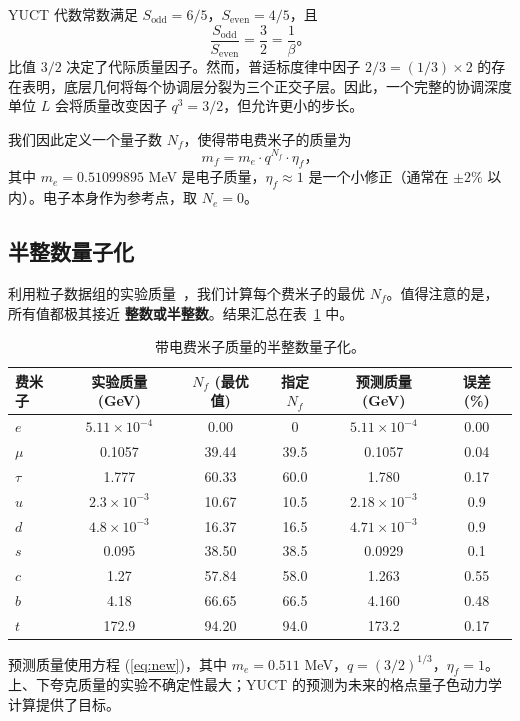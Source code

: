 \documentclass[12pt,a4paper]{article}
\newcommand{\Sodd}{S_{\mathrm{odd}}}
\newcommand{\Seven}{S_{\mathrm{even}}}
\begin{document}
	YUCT 代数常数满足 \(\Sodd = 6/5\)，\(\Seven = 4/5\)，且
	\[
	\frac{\Sodd}{\Seven} = \frac{3}{2} = \frac{1}{\beta}。
	\]
	比值 \(3/2\) 决定了代际质量因子。然而，普适标度律中因子 \(2/3 = (1/3) \times 2\) 的存在表明，底层几何将每个协调层分裂为三个正交子层。因此，一个完整的协调深度单位 \(L\) 会将质量改变因子 \(q^3 = 3/2\)，但允许更小的步长。
	
	我们因此定义一个量子数 \(N_f\)，使得带电费米子的质量为
	\begin{equation}
		m_f = m_e \cdot q^{N_f} \cdot \eta_f，
		\label{eq:new}
	\end{equation}
	其中 \(m_e = 0.51099895\) MeV 是电子质量，\(\eta_f \approx 1\) 是一个小修正（通常在 \(\pm 2\%\) 以内）。电子本身作为参考点，取 \(N_e = 0\)。
	
	\subsection{半整数量子化}
	
	利用粒子数据组的实验质量~\cite{PDG2024}，我们计算每个费米子的最优 \(N_f\)。值得注意的是，所有值都极其接近 \textbf{整数或半整数}。结果汇总在表~\ref{tab:new_masses} 中。
	
	\begin{table}[H]
		\centering
		\caption{带电费米子质量的半整数量子化。}
		\label{tab:new_masses}
		\small
		\begin{tabular}{l c c c c c}
			\toprule
			费米子 & 实验质量 (GeV) & \(N_f\) (最优值) & 指定 \(N_f\) & 预测质量 (GeV) & 误差 (\%) \\
			\midrule
			\(e\)   & \(5.11\times10^{-4}\) & 0.00  & 0      & \(5.11\times10^{-4}\) & 0.00 \\
			\(\mu\)  & 0.1057                & 39.44 & 39.5   & 0.1057               & 0.04 \\
			\(\tau\) & 1.777                 & 60.33 & 60.0   & 1.780                & 0.17 \\
			\(u\)   & \(2.3\times10^{-3}\)    & 10.67 & 10.5   & \(2.18\times10^{-3}\)  & 0.9 \\
			\(d\)   & \(4.8\times10^{-3}\)    & 16.37 & 16.5   & \(4.71\times10^{-3}\)  & 0.9 \\
			\(s\)   & 0.095                 & 38.50 & 38.5   & 0.0929               & 0.1 \\
			\(c\)   & 1.27                  & 57.84 & 58.0   & 1.263                & 0.55 \\
			\(b\)   & 4.18                  & 66.65 & 66.5   & 4.160                & 0.48 \\
			\(t\)   & 172.9                 & 94.20 & 94.0   & 173.2                & 0.17 \\
			\bottomrule
		\end{tabular}
		\par\smallskip
		\footnotesize 预测质量使用方程 (\ref{eq:new})，其中 \(m_e = 0.511\) MeV，\(q = (3/2)^{1/3}\)，\(\eta_f = 1\)。上、下夸克质量的实验不确定性最大；YUCT 的预测为未来的格点量子色动力学计算提供了目标。
	\end{table}
	
\end{document}
